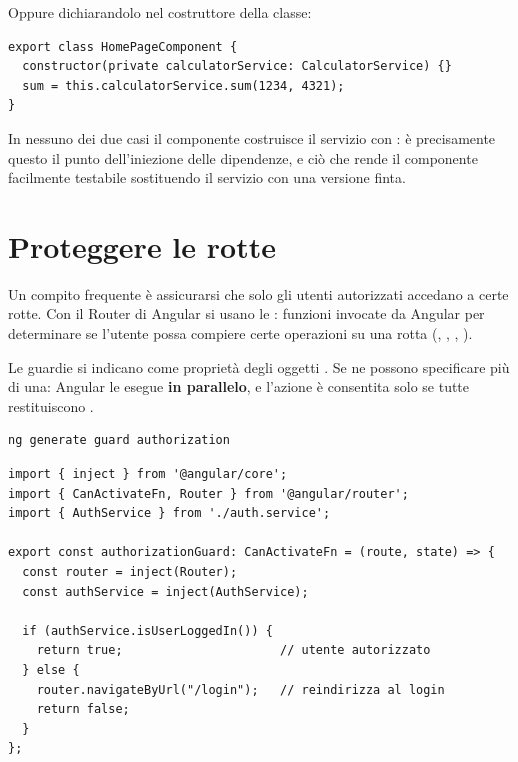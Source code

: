 Oppure dichiarandolo nel costruttore della classe:

\begin{lstlisting}[style=ts, name=home-page.component.ts]
export class HomePageComponent {
  constructor(private calculatorService: CalculatorService) {}
  sum = this.calculatorService.sum(1234, 4321);
}
\end{lstlisting}

In nessuno dei due casi il componente costruisce il servizio con : è
precisamente questo il punto dell'iniezione delle dipendenze, e ciò che rende il
componente facilmente testabile sostituendo il servizio con una versione finta.

\section{Proteggere le rotte}

Un compito frequente è assicurarsi che solo gli utenti autorizzati accedano a
certe rotte. Con il Router di Angular si usano le : funzioni
invocate da Angular per determinare se l'utente possa compiere certe operazioni
su una rotta (, , ,
).

Le guardie si indicano come proprietà degli oggetti . Se ne possono
specificare più di una: Angular le esegue \textbf{in parallelo}, e l'azione è
consentita solo se tutte restituiscono .

\begin{lstlisting}[style=shell]
ng generate guard authorization
\end{lstlisting}

\begin{lstlisting}[style=ts, name=authorization.guard.ts]
import { inject } from '@angular/core';
import { CanActivateFn, Router } from '@angular/router';
import { AuthService } from './auth.service';

export const authorizationGuard: CanActivateFn = (route, state) => {
  const router = inject(Router);
  const authService = inject(AuthService);

  if (authService.isUserLoggedIn()) {
    return true;                      // utente autorizzato
  } else {
    router.navigateByUrl("/login");   // reindirizza al login
    return false;
  }
};
\end{lstlisting}

